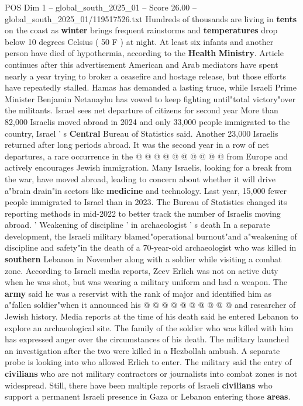 \begin{textsample}{POS Dim 1 – global\_south\_2025\_01 – Score 26.00 – global\_south\_2025\_01/119517526.txt}
Hundreds of thousands are living in \textbf{tents} on the coast as \textbf{winter} brings frequent rainstorms and \textbf{temperatures} drop below 10 degrees Celsius ( 50 F ) at night.
At least six infants and another person have died of hypothermia, according to the \textbf{Health} \textbf{Ministry}.
Article continues after this advertisement American and Arab mediators have spent nearly a year trying to broker a ceasefire and hostage release, but those efforts have repeatedly stalled.
Hamas has demanded a lasting truce, while Israeli Prime Minister Benjamin Netanayhu has vowed to keep fighting until"total victory"over the militants.
Israel sees net departure of citizens for second year More than 82,000 Israelis moved abroad in 2024 and only 33,000 people immigrated to the country, Israel ' s \textbf{Central} Bureau of Statistics said.
Another 23,000 Israelis returned after long periods abroad.
It was the second year in a row of net departures, a rare occurrence in the @ @ @ @ @ @ @ @ @ @ from Europe and actively encourages Jewish immigration.
Many Israelis, looking for a break from the war, have moved abroad, leading to concern about whether it will drive a"brain drain"in sectors like \textbf{medicine} and technology.
Last year, 15,000 fewer people immigrated to Israel than in 2023.
The Bureau of Statistics changed its reporting methods in mid-2022 to better track the number of Israelis moving abroad. ' Weakening of discipline ' in archaeologist ' s death In a separate development, the Israeli military blamed"operational burnout"and a"weakening of discipline and safety"in the death of a 70-year-old archaeologist who was killed in \textbf{southern} Lebanon in November along with a soldier while visiting a combat zone.
According to Israeli media reports, Zeev Erlich was not on active duty when he was shot, but was wearing a military uniform and had a weapon.
The \textbf{army} said he was a reservist with the rank of major and identified him as a"fallen soldier"when it announced his @ @ @ @ @ @ @ @ @ @ and researcher of Jewish history.
Media reports at the time of his death said he entered Lebanon to explore an archaeological site.
The family of the soldier who was killed with him has expressed anger over the circumstances of his death.
The military launched an investigation after the two were killed in a Hezbollah ambush.
A separate probe is looking into who allowed Erlich to enter.
The military said the entry of \textbf{civilians} who are not military contractors or journalists into combat zones is not widespread.
Still, there have been multiple reports of Israeli \textbf{civilians} who support a permanent Israeli presence in Gaza or Lebanon entering those \textbf{areas}.

\end{textsample}
